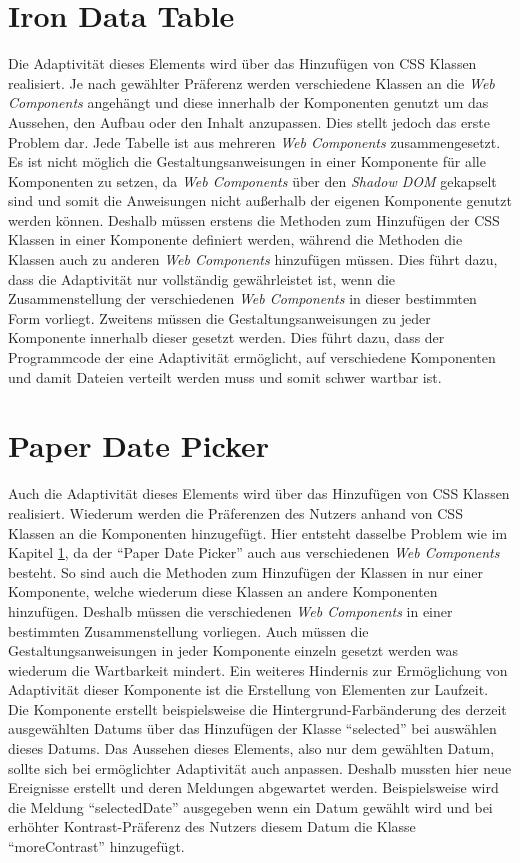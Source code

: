 \documentclass[12pt, paper=a4, bibtotoc, toc=listof, headsepline=true]{scrreprt}
\begin{document}
	\section{Iron Data Table}
	\label{sec:evaIroDatTab}
	Die Adaptivität dieses Elements wird über das Hinzufügen von \ac{CSS} Klassen realisiert. Je nach gewählter Präferenz werden verschiedene Klassen an die \emph{Web Components} angehängt und diese innerhalb der Komponenten genutzt um das Aussehen, den Aufbau oder den Inhalt anzupassen. Dies stellt jedoch das erste Problem dar. Jede Tabelle ist aus mehreren \emph{Web Components} zusammengesetzt. Es ist nicht möglich die Gestaltungsanweisungen in einer Komponente für alle Komponenten zu setzen, da \emph{Web Components} über den \emph{Shadow DOM} gekapselt sind und somit die Anweisungen nicht außerhalb der eigenen Komponente genutzt werden können. Deshalb müssen erstens die Methoden zum Hinzufügen der \ac{CSS} Klassen in einer Komponente definiert werden, während die Methoden die Klassen auch zu anderen \emph{Web Components} hinzufügen müssen. Dies führt dazu, dass die Adaptivität nur vollständig gewährleistet ist, wenn die Zusammenstellung der verschiedenen \emph{Web Components} in dieser bestimmten Form vorliegt. Zweitens müssen die Gestaltungsanweisungen zu jeder Komponente innerhalb dieser gesetzt werden. Dies führt dazu, dass der Programmcode der eine Adaptivität ermöglicht, auf verschiedene Komponenten und damit Dateien verteilt werden muss und somit schwer wartbar ist. 
	\section{Paper Date Picker} 
	Auch die Adaptivität dieses Elements wird über das Hinzufügen von \ac{CSS} Klassen realisiert. Wiederum werden die Präferenzen des Nutzers anhand von \ac{CSS} Klassen an die Komponenten hinzugefügt. Hier entsteht dasselbe Problem wie im Kapitel \ref{sec:evaIroDatTab}, da der \enquote{Paper Date Picker} auch aus verschiedenen \emph{Web Components} besteht. So sind auch die Methoden zum Hinzufügen der Klassen in nur einer Komponente, welche wiederum diese Klassen an andere Komponenten hinzufügen. Deshalb müssen die verschiedenen \emph{Web Components} in einer bestimmten Zusammenstellung vorliegen. Auch müssen die Gestaltungsanweisungen in jeder Komponente einzeln gesetzt werden was wiederum die Wartbarkeit mindert. Ein weiteres Hindernis zur Ermöglichung von Adaptivität dieser Komponente ist die Erstellung von Elementen zur Laufzeit. Die Komponente erstellt beispielsweise die Hintergrund-Farbänderung des derzeit ausgewählten Datums über das Hinzufügen der Klasse \enquote{selected} bei auswählen dieses Datums. Das Aussehen dieses Elements, also nur dem gewählten Datum, sollte sich bei ermöglichter Adaptivität auch anpassen. Deshalb mussten hier neue Ereignisse erstellt und deren Meldungen abgewartet werden. Beispielsweise wird die Meldung \enquote{selectedDate} ausgegeben wenn ein Datum gewählt wird und bei erhöhter Kontrast-Präferenz des Nutzers diesem Datum die Klasse \enquote{moreContrast} hinzugefügt.
	
\end{document}
